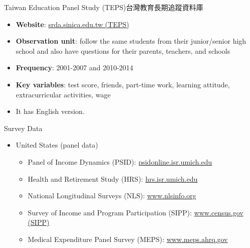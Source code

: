 \documentclass[hyperref={pdfpagelabels=false}]{beamer}
\begin{document}
\begin{frame}{Taiwan Education Panel Study (TEPS)}{台灣教育長期追蹤資料庫}
	\begin{itemize} 
		\item \textbf{Website}:  \href{https://srda.sinica.edu.tw/browsingbydatatype_result.php?category=surveymethod\&type=2\&csid=7}{srda.sinica.edu.tw (TEPS)}
		\vspace{0.2cm}
		\item \textbf{Observation unit}: follow the same students from their junior/senior high school and also have questions for their parents, teachers, and schools
		\vspace{0.2cm}
		\item \textbf{Frequency}: 2001-2007 and 2010-2014 
		\vspace{0.2cm}
		\item \textbf{Key variables}: test score, friends, part-time work, learning attitude, extracurricular activities, wage
		\vspace{0.2cm}
		\item It has English version. 
		
		
	\end{itemize}
\end{frame}





\begin{frame}{Survey Data}
\begin{itemize} 
\item United States (panel data)
\vspace{0.3cm}
\begin{itemize} 
\item Panel of Income Dynamics (PSID): \href{https://psidonline.isr.umich.edu}{psidonline.isr.umich.edu}
\vspace{0.3cm}
\item Health and Retirement Study (HRS): \href{https://hrs.isr.umich.edu/data-products}{hrs.isr.umich.edu}
\vspace{0.3cm}
\item National Longitudinal Surveys (NLS): \href{https://www.nlsinfo.org/content/getting-started/accessing-data}{www.nlsinfo.org}
\vspace{0.3cm}
\item Survey of Income and Program Participation (SIPP): \href{https://www.census.gov/programs-surveys/sipp/data/datasets.html}{www.census.gov (SIPP)}
\vspace{0.3cm}
\item Medical Expenditure Panel Survey (MEPS): \href{https://www.meps.ahrq.gov/mepsweb/}{www.meps.ahrq.gov}


\end{itemize}

\end{itemize}
\end{frame}
\end{document}
